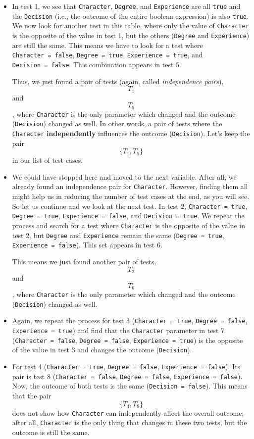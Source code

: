 \begin{itemize}
\item
  In test 1, we see that \texttt{Character}, \texttt{Degree}, and
  \texttt{Experience} are all \texttt{true} and the \texttt{Decision}
  (i.e., the outcome of the entire boolean expression) is also
  \texttt{true}. We now look for another test in this table, where only
  the value of \texttt{Character} is the opposite of the value in test
  1, but the others (\texttt{Degree} and \texttt{Experience}) are still
  the same. This means we have to look for a test where
  \texttt{Character\ =\ false}, \texttt{Degree\ =\ true},
  \texttt{Experience\ =\ true}, and \texttt{Decision\ =\ false}. This
  combination appears in test 5.

  Thus, we just found a pair of tests (again, called \emph{independence
  pairs}), \[T_1\] and \[T_5\], where \texttt{Character} is the only
  parameter which changed and the outcome (\texttt{Decision}) changed as
  well. In other words, a pair of tests where the \texttt{Character}
  \textbf{independently} influences the outcome (\texttt{Decision}).
  Let's keep the pair \[\{T_1, T_5\}\] in our list of test cases.
\item
  We could have stopped here and moved to the next variable. After all,
  we already found an independence pair for \texttt{Character}. However,
  finding them all might help us in reducing the number of test cases at
  the end, as you will see. So let us continue and we look at the next
  test. In test 2, \texttt{Character\ =\ true},
  \texttt{Degree\ =\ true}, \texttt{Experience\ =\ false}, and
  \texttt{Decision\ =\ true}. We repeat the process and search for a
  test where \texttt{Character} is the opposite of the value in test 2,
  but \texttt{Degree} and \texttt{Experience} remain the same
  (\texttt{Degree\ =\ true}, \texttt{Experience\ =\ false}). This set
  appears in test 6.

  This means we just found another pair of tests, \[T_2\] and \[T_6\],
  where \texttt{Character} is the only parameter which changed and the
  outcome (\texttt{Decision}) changed as well.
\item
  Again, we repeat the process for test 3 (\texttt{Character\ =\ true},
  \texttt{Degree\ =\ false}, \texttt{Experience\ =\ true}) and find that
  the \texttt{Character} parameter in test 7
  (\texttt{Character\ =\ false}, \texttt{Degree\ =\ false},
  \texttt{Experience\ =\ true}) is the opposite of the value in test 3
  and changes the outcome (\texttt{Decision}).
\item
  For test 4 (\texttt{Character\ =\ true}, \texttt{Degree\ =\ false},
  \texttt{Experience\ =\ false}). Its pair is test 8
  (\texttt{Character\ =\ false}, \texttt{Degree\ =\ false},
  \texttt{Experience\ =\ false}). Now, the outcome of both tests is the
  same (\texttt{Decision\ =\ false}). This means that the pair
  \[\{T_4, T_8\}\] does not show how \texttt{Character} can
  independently affect the overall outcome; after all,
  \texttt{Character} is the only thing that changes in these two tests,
  but the outcome is still the same.
\end{itemize}

